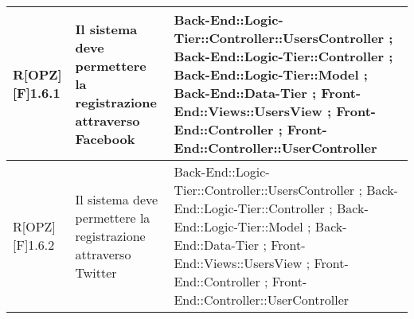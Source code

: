 \begin{table}[h]
\begin{tabular}{|p{}|p{}|p{}|}
			R[OPZ][F]1.6.1 & Il sistema deve permettere la registrazione attraverso Facebook & Back-End::Logic-Tier::Controller::UsersController ; Back-End::Logic-Tier::Controller ; Back-End::Logic-Tier::Model ; Back-End::Data-Tier ; Front-End::Views::UsersView ; Front-End::Controller ; Front-End::Controller::UserController \\ \midrule
			R[OPZ][F]1.6.2 & Il sistema deve permettere la registrazione attraverso Twitter & Back-End::Logic-Tier::Controller::UsersController ; Back-End::Logic-Tier::Controller ; Back-End::Logic-Tier::Model ; Back-End::Data-Tier ; Front-End::Views::UsersView ; Front-End::Controller ; Front-End::Controller::UserController \\ \midrule
			
		\end{tabular}
		\end{table}
		\newpage
			
